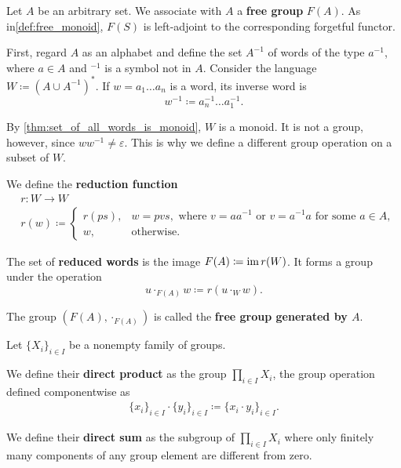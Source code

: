 \begin{definition}\label{def:free_group}\cite[306]{Knapp2016BAlg}
  Let \( A \) be an arbitrary set. We associate with \( A \) a \textbf{free group} \( F(A) \). As in\cref{def:free_monoid}, \( F(S) \) is left-adjoint to the corresponding forgetful functor.

  First, regard \( A \) as an alphabet and define the set \( A^{-1} \) of words of the type \( a^{-1} \), where \( a \in A \) and \( \mbox{}^{-1} \) is a symbol not in \( A \). Consider the language \( W \coloneqq (A \cup A^{-1})^{*} \). If \( w = a_1 \ldots a_n \) is a word, its inverse word is
  \begin{equation*}
    w^{-1} \coloneqq a_n^{-1} \ldots a_1^{-1}.
  \end{equation*}

  By \cref{thm:set_of_all_words_is_monoid}, \( W \) is a monoid. It is not a group, however, since \( w w^{-1} \neq \varepsilon \). This is why we define a different group operation on a subset of \( W \).

  We define the \textbf{reduction function}
  \begin{align*}
    &r: W \to W \\
    &r(w) \coloneqq \begin{cases}
      r(ps), &w = pvs, \text{ where } v = aa^{-1} \text{ or } v = a^{-1}a \text{ for some } a \in A, \\
      w, &\text{otherwise}.
    \end{cases}
  \end{align*}

  The set of \textbf{reduced words} is the image \( F(A) \coloneqq \operatorname{im} r(W) \). It forms a group under the operation
  \begin{equation*}
    u \cdot_{F(A)} w \coloneqq r(u \cdot_{W} w).
  \end{equation*}

  The group \( (F(A), \cdot_{F(A)}) \) is called the \textbf{free group generated by \( A \)}.
\end{definition}

\begin{definition}\label{def:group_direct_product}
  Let \( \{ X_i \}_{i \in I} \) be a nonempty family of groups.

  We define their \textbf{direct product} as the group \( \prod_{i \in I} X_i \), the group operation defined componentwise as
  \begin{align*}
    \{ x_i \}_{i \in I} \cdot \{ y_i \}_{i \in I}
    \coloneqq
    \{ x_i \cdot y_i \}_{i \in I}.
  \end{align*}

  We define their \textbf{direct sum} as the subgroup of \( \prod_{i \in I} X_i \) where only finitely many components of any group element are different from zero.
\end{definition}

